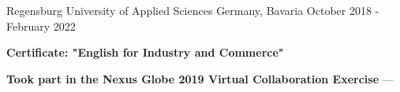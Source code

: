 

\begin{cventries}
  \cventry
    {} %
    {Regensburg University of Applied Sciences} %
    {Germany, Bavaria} %
    {October 2018 - February 2022} %
    {
      \begin{cvitems} %
        \item {\textbf{Certificate: "English for Industry and Commerce"}}
        \vspace{0.5mm}
        \item {\textbf{Took part in the Nexus Globe 2019 Virtual Collaboration Exercise} --- }
      \end{cvitems}
    }
\end{cventries}